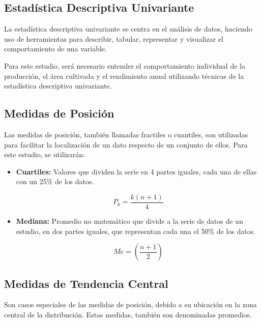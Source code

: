 \documentclass[oneside,11pt]{Latex/Classes/PhDthesisPSnPDF}
\begin{document}
\hfill\break

\subsection{Estadística Descriptiva Univariante}

La estadística descriptiva univariante se centra en el análisis de
datos, haciendo uso de herramientas para describir, tabular, representar
y visualizar el comportamiento de una variable.

Para este estudio, será necesario entender el comportamiento individual
de la producción, el área cultivada y el rendimiento anual utilizando
técnicas de la estadística descriptiva univariante.\\

\subsection*{Medidas de Posición}

Las medidas de posición, también llamadas fractiles o cuantiles, son
utilizadas para facilitar la localización de un dato respecto de un
conjunto de ellos. Para este estudio, se utilizarán:

\begin{itemize}
\item{\textbf{Cuartiles:} Valores que dividen la serie en 4 partes iguales, cada una de ellas con un 25\% de los datos.}

$$P_k = \frac{k(n + 1)}{4}$$

\item{\textbf{Mediana:} Promedio no matemático que divide a la serie de datos de un estudio, en dos partes iguales, que representan cada una el 50\% de los datos.}

$$Me = \left(\frac{n+1}{2}\right)$$
\end{itemize}

\hfill\break

\subsection*{Medidas de Tendencia Central}

Son casos especiales de las medidas de posición, debido a su ubicación
en la zona central de la distribución. Estas medidas, también son
denominadas promedios.
\end{document}
